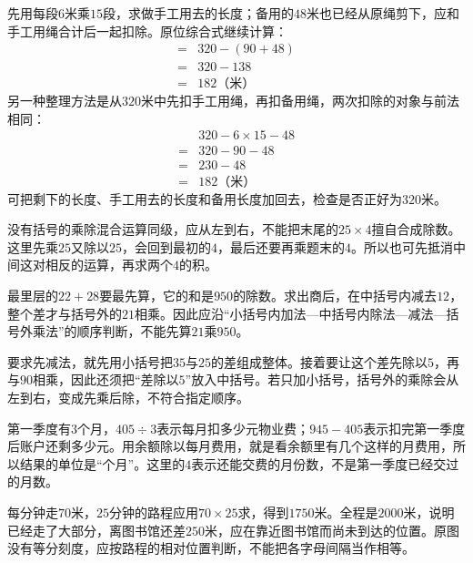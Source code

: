 \documentclass[multi=snippet,border=0pt]{standalone}
\newenvironment{snippet}[3]{\begin{minipage}{#1bp}\color{answerred}\fontsize{#2}{#3}\selectfont\raggedright}{\end{minipage}}
\begin{document}
\begin{snippet}{505}{11.5}{14}先用每段\(6\)米乘\(15\)段，求做手工用去的长度；备用的\(48\)米也已经从原绳剪下，应和手工用绳合计后一起扣除。原位综合式继续计算：\[\begin{aligned}={}&320-(90+48)\\={}&320-138\\={}&182\text{（米）}\end{aligned}\]另一种整理方法是从\(320\)米中先扣手工用绳，再扣备用绳，两次扣除的对象与前法相同：\[\begin{aligned}&320-6\times15-48\\={}&320-90-48\\={}&230-48\\={}&182\text{（米）}\end{aligned}\]可把剩下的长度、手工用去的长度和备用长度加回去，检查是否正好为\(320\)米。\end{snippet}
\begin{snippet}{505}{11.5}{14}没有括号的乘除混合运算同级，应从左到右，不能把末尾的\(25\times4\)擅自合成除数。这里先乘\(25\)又除以\(25\)，会回到最初的\(4\)，最后还要再乘题末的\(4\)。所以也可先抵消中间这对相反的运算，再求两个\(4\)的积。\end{snippet}
\begin{snippet}{505}{11.5}{14}最里层的\(22+28\)要最先算，它的和是\(950\)的除数。求出商后，在中括号内减去\(12\)，整个差才与括号外的\(21\)相乘。因此应沿“小括号内加法—中括号内除法—减法—括号外乘法”的顺序判断，不能先算\(21\)乘\(950\)。\end{snippet}
\begin{snippet}{505}{11.5}{14}要求先减法，就先用小括号把\(35\)与\(25\)的差组成整体。接着要让这个差先除以\(5\)，再与\(90\)相乘，因此还须把“差除以\(5\)”放入中括号。若只加小括号，括号外的乘除会从左到右，变成先乘后除，不符合指定顺序。\end{snippet}
\begin{snippet}{505}{11.5}{14}第一季度有\(3\)个月，\(405\div3\)表示每月扣多少元物业费；\(945-405\)表示扣完第一季度后账户还剩多少元。用余额除以每月费用，就是看余额里有几个这样的月费用，所以结果的单位是“个月”。这里的\(4\)表示还能交费的月份数，不是第一季度已经交过的月数。\end{snippet}
\begin{snippet}{505}{11.5}{14}每分钟走\(70\)米，\(25\)分钟的路程应用\(70\times25\)求，得到\(1750\)米。全程是\(2000\)米，说明已经走了大部分，离图书馆还差\(250\)米，应在靠近图书馆而尚未到达的位置。原图没有等分刻度，应按路程的相对位置判断，不能把各字母间隔当作相等。\end{snippet}
\end{document}
